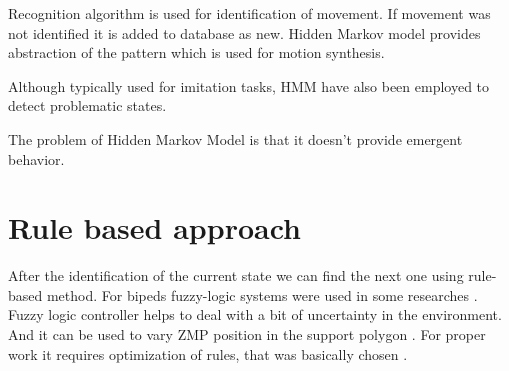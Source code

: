 \documentclass[11pt,a4paper]{report}
\begin{document}
			Recognition algorithm is used for identification of movement. If movement was not identified it is added to database as new. Hidden Markov model provides abstraction of the pattern which is used for motion synthesis.
			
			Although typically used for imitation tasks, HMM have also been employed to detect problematic states.
			
			The problem of Hidden Markov Model is that it doesn't provide emergent behavior.
		\section{Rule based approach}
			After the identification of the current state we can find the next one using rule-based method. For bipeds fuzzy-logic systems were used in some researches \cite{park2003fuzzy}.  Fuzzy logic controller helps to deal with a bit of uncertainty in the environment. And it can be used to vary ZMP position in the support polygon \cite{park2003fuzzy}. For proper work it requires optimization of rules, that was basically chosen \cite{vundavilli2010dynamically}.
	
	
	
  
\end{document}
